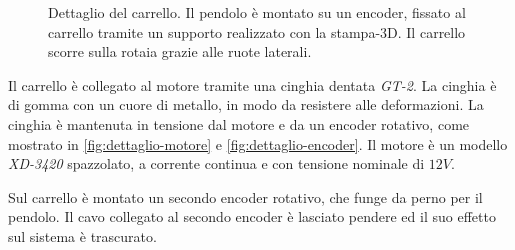 \begin{figure}
    \centering
    \caption[Dettaglio del carrello]{Dettaglio del carrello. Il pendolo è montato
    su un encoder, fissato al carrello tramite un supporto realizzato con la
    stampa-3D. Il carrello scorre sulla rotaia grazie alle ruote laterali.}
    \label{fig:dettaglio-carrello}
\end{figure}

Il carrello è collegato al motore tramite una cinghia dentata \emph{GT-2}.
La cinghia è di gomma con un cuore di metallo, in modo da resistere
alle deformazioni. La cinghia è mantenuta in tensione dal motore e da un
encoder rotativo, come mostrato in \autoref{fig:dettaglio-motore} e 
\autoref{fig:dettaglio-encoder}. Il motore è un modello \emph{XD-3420}
spazzolato, a corrente continua e con tensione nominale di $12V$.

Sul carrello è montato un secondo encoder rotativo,
che funge da perno per il pendolo. Il cavo collegato al secondo encoder è lasciato pendere ed il suo effetto sul sistema è trascurato.

